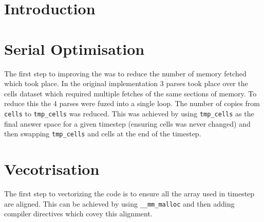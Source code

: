 \documentclass{article}
\begin{document}
\begin{multicols}{2}

\section{Introduction}

\section{Serial Optimisation}

The first step to improving the was to reduce the number of memory fetched
which took place. In the original implementation 3 parses took place over the
cells dataset which required multiple fetches of the same sections of memory.
To reduce this the 4 parses were fuzed into a single loop. The number of copies
from \verb|cells| to \verb|tmp_cells| was reduced. This was achieved by using
\verb|tmp_cells| as the final answer space for a given timestep (ensuring cells was
never changed) and then swapping \verb|tmp_cells| and cells at the end of the
timestep.


\section{Vecotrisation}

The first step to vectorizing the code is to ensure all the array used in
timestep are aligned. This can be achieved by using \verb|__mm_malloc| and then
adding compiler directives which covey this alignment.


\end{multicols}
\end{document}
